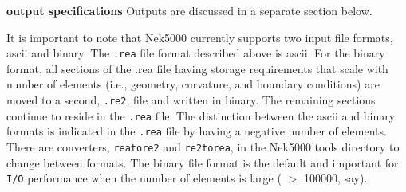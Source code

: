 \begin{description}

\item{\bf output specifications} 
     Outputs are discussed in a separate section below.
\end{description}


\noindent
It is important to note that Nek5000 currently supports two input file
formats, ascii and binary.   The {\tt .rea} file format
described above is ascii.  For the binary format, all sections
of the .rea file having storage requirements that scale with 
number of elements (i.e., geometry, curvature, and boundary 
conditions) are moved to a second, {\tt .re2}, file and
written in binary.   The remaining sections continue to 
reside in the {\tt .rea} file.   The distinction between
the ascii and binary formats is indicated in the {\tt .rea}
file by having a negative number of elements.
There are converters, {\tt reatore2} and {\tt re2torea}, in the Nek5000
tools directory to change between formats.   The binary file
format is the default and important for {\tt I/O} performance when the
number of elements is large ( $>$ 100000, say).
